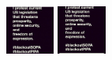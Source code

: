 \documentclass{acm_proc_article-sp}
\newcommand{\thumbheight}{16mm}
\newenvironment{thumbsequence}{}{\makebox[4mm]{}}
\begin{document}
\begin{figure}
\begin{centering}
\begin{thumbsequence}
		\includegraphics[height=\thumbheight]{resources/sopa/looseduplicate5.jpg}
		\includegraphics[height=\thumbheight]{resources/sopa/looseduplicate6.jpg}
	\end{thumbsequence}

\end{centering}
\end{figure}
\end{document}
